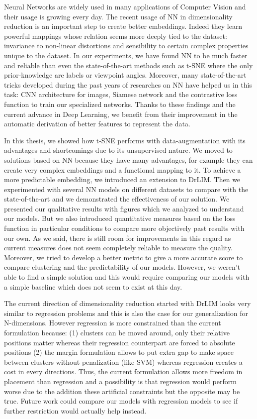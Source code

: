 \documentclass[a4paper,12pt]{report}
\begin{document}
Neural Networks are widely used in many applications of Computer Vision and their usage is growing every day.
The recent usage of NN in dimensionality reduction is an important step to create better embeddings.
Indeed they learn powerful mappings whose relation seems more deeply tied to the dataset: invariance to non-linear distortions and sensibility to certain complex properties unique to the dataset.
In our experiments, we have found NN to be much faster and reliable than even the state-of-the-art methods such as t-SNE where the only prior-knowledge are labels or viewpoint angles.
Moreover, many state-of-the-art tricks developed during the past years of researches on NN have helped us in this task: CNN architecture for images, Siamese network and the contrastive loss function to train our specialized networks.
Thanks to these findings and the current advance in Deep Learning, we benefit from their improvement in the automatic derivation of better features to represent the data.

In this thesis, we showed how t-SNE performs with data-augmentation with its advantages and shortcomings due to its unsupervised nature.
We moved to solutions based on NN because they have many advantages, for example they can create very complex embeddings and a functional mapping to it.
To achieve a more predictable embedding, we introduced an extension to DrLIM.
Then we experimented with several NN models on different datasets to compare with the state-of-the-art and we demonstrated the effectiveness of our solution.
We presented our qualitative results with figures which we analyzed to understand our models.
But we also introduced quantitative measures based on the loss function in particular conditions to compare more objectively past results with our own.
As we said, there is still room for improvements in this regard as current measures does not seem completely reliable to measure the quality.
Moreover, we tried to develop a better metric to give a more accurate score to compare clustering and the predictability of our models.
However, we weren't able to find a simple solution and this would require comparing our models with a simple baseline which does not seem to exist at this day.

The current direction of dimensionality reduction started with DrLIM looks very similar to regression problems and this is also the case for our generalization for N-dimensions.
However regression is more constrained than the current formulation because: (1) clusters can be moved around, only their relative positions matter whereas their regression counterpart are forced to absolute positions (2) the margin formulation allows to put extra gap to make space between clusters without penalization (like SVM) whereas regression creates a cost in every directions.
Thus, the current formulation allows more freedom in placement than regression and a possibility is that regression would perform worse due to the addition these artificial constraints but the opposite may be true.
Future work could compare our models with regression models to see if further restriction would actually help instead.
\end{document}
